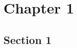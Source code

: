 \documentclass[main]{subfiles}
\begin{document}
\chapter{Chapter 1}

\newpage

\section{Section 1}
\end{document}

